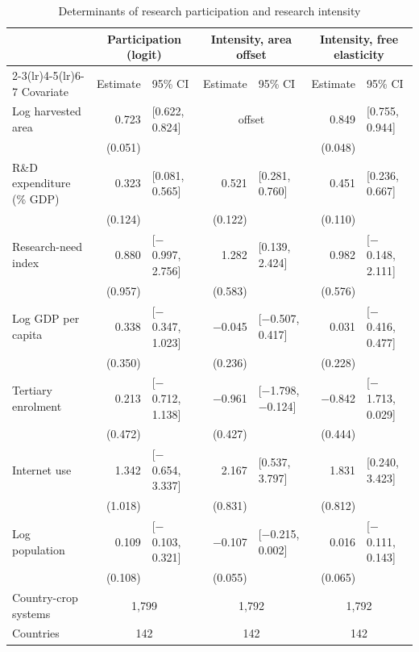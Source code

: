 \documentclass[ASNA,twocolumn]{USG}
\begin{document}
\begin{table}[!t]
\centering
\footnotesize
\caption{Determinants of research participation and research intensity}
\label{tab:reg}
\begin{tabular*}{\textwidth}{@{\extracolsep\fill}l r@{\hspace{4pt}}l r@{\hspace{4pt}}l r@{\hspace{4pt}}l@{}}
\toprule
& \multicolumn{2}{c}{Participation (logit)} & \multicolumn{2}{c}{Intensity, area offset} & \multicolumn{2}{c}{Intensity, free elasticity} \\
\cmidrule(lr){2-3}\cmidrule(lr){4-5}\cmidrule(lr){6-7}
Covariate & Estimate & 95\% CI & Estimate & 95\% CI & Estimate & 95\% CI \\
\midrule
Log harvested area & 0.723 & [0.622, 0.824] & \multicolumn{2}{c}{offset} & 0.849 & [0.755, 0.944] \\
 & (0.051) & &  & & (0.048) & \\
R\&D expenditure (\% GDP) & 0.323 & [0.081, 0.565] & 0.521 & [0.281, 0.760] & 0.451 & [0.236, 0.667] \\
 & (0.124) & & (0.122) & & (0.110) & \\
Research-need index & 0.880 & [$-$0.997, 2.756] & 1.282 & [0.139, 2.424] & 0.982 & [$-$0.148, 2.111] \\
 & (0.957) & & (0.583) & & (0.576) & \\
Log GDP per capita & 0.338 & [$-$0.347, 1.023] & $-$0.045 & [$-$0.507, 0.417] & 0.031 & [$-$0.416, 0.477] \\
 & (0.350) & & (0.236) & & (0.228) & \\
Tertiary enrolment & 0.213 & [$-$0.712, 1.138] & $-$0.961 & [$-$1.798, $-$0.124] & $-$0.842 & [$-$1.713, 0.029] \\
 & (0.472) & & (0.427) & & (0.444) & \\
Internet use & 1.342 & [$-$0.654, 3.337] & 2.167 & [0.537, 3.797] & 1.831 & [0.240, 3.423] \\
 & (1.018) & & (0.831) & & (0.812) & \\
Log population & 0.109 & [$-$0.103, 0.321] & $-$0.107 & [$-$0.215, 0.002] & 0.016 & [$-$0.111, 0.143] \\
 & (0.108) & & (0.055) & & (0.065) & \\
\midrule
Country-crop systems & \multicolumn{2}{c}{1,799} & \multicolumn{2}{c}{1,792} & \multicolumn{2}{c}{1,792} \\
Countries & \multicolumn{2}{c}{142} & \multicolumn{2}{c}{142} & \multicolumn{2}{c}{142} \\

\end{tabular*}
\end{table}
\end{document}
